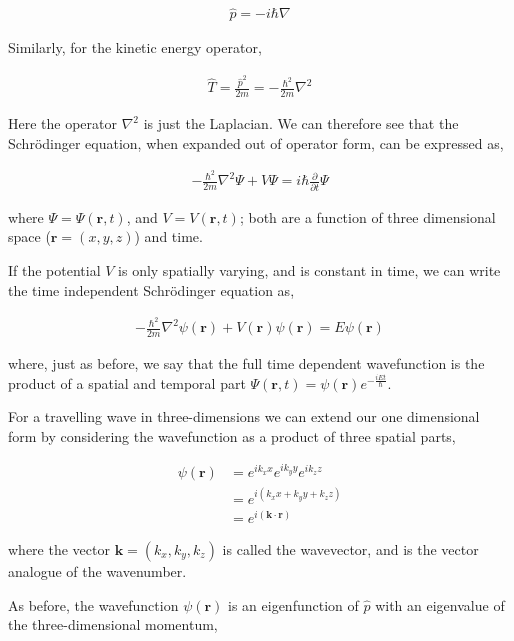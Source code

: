 \documentclass[11pt]{amsart}
\begin{document}
\begin{align*}
  \hat{p}=-i\hbar\nabla
\end{align*}

Similarly, for the kinetic energy operator,

\begin{align*}
  \hat{T}=\frac{{\hat{p}}^2}{2m}=-\frac{\hbar^2}{2m}\nabla^2
\end{align*}

Here the operator $\nabla^2$ is just the Laplacian. We can therefore see that the Schr\"{o}dinger equation, when expanded out of operator form, can be expressed as,

\begin{align*}
  -\frac{\hbar^2}{2m}\nabla^2\Psi+V\Psi=i\hbar\frac{\partial}{\partial t}\Psi
\end{align*}

where $\Psi = \Psi(\mathbf{r}, t)$, and $V = V(\mathbf{r}, t)$; both are a function of three dimensional space ($\mathbf{r} = (x, y, z)$) and time.

If the potential $V$ is only spatially varying, and is constant in time, we can write the time independent Schr\"{o}dinger equation as,

\begin{align*}
  -\frac{\hbar^2}{2m}\nabla^2\psi(\mathbf{r})+V(\mathbf{r})\psi(\mathbf{r})=E\psi(\mathbf{r})
\end{align*}

where, just as before, we say that the full time dependent wavefunction is the product of a spatial and temporal part $\Psi(\mathbf{r},t)=\psi(\mathbf{r})e^{-\frac{iEt}{\hbar}}$.

For a travelling wave in three-dimensions we can extend our one dimensional form by considering the wavefunction as a product of three spatial parts,

\begin{align*}
  \psi(\mathbf{r})&=e^{ik_xx}e^{ik_yy}e^{ik_zz} \\
                  &=e^{i(k_xx+k_yy+k_zz)} \\
                  &=e^{i(\mathbf{k}\cdot\mathbf{r})}
\end{align*}

where the vector $\mathbf{k}=(k_x,k_y,k_z)$ is called the wavevector, and is the vector analogue of the wavenumber.

As before, the wavefunction $\psi(\mathbf{r})$ is an eigenfunction of $\hat{p}$ with an eigenvalue of the three-dimensional momentum,
\end{document}
